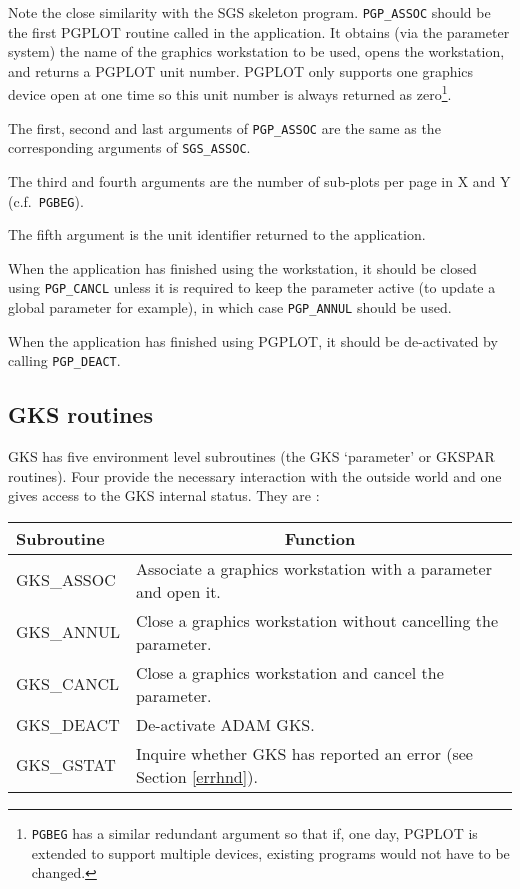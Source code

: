 Note the close similarity with the SGS skeleton program. {\tt PGP\_ASSOC} 
should be
the first PGPLOT routine called in the application. It obtains (via the
parameter system) the name of the graphics workstation  to be used, opens the
workstation, and returns a PGPLOT unit number. PGPLOT only supports one
graphics device open at one time so this unit number is always returned as
zero\footnote{{\tt PGBEG} has a similar redundant argument so that if, one day,
PGPLOT is extended to support multiple devices, existing programs would not
have to be changed.}.

The first, second and last arguments of {\tt PGP\_ASSOC} are the same as the
corresponding arguments of {\tt SGS\_ASSOC}.

The third and fourth arguments are the number of sub-plots per page in X and Y
(c.f.\ {\tt PGBEG}).

The fifth argument is the unit identifier returned to the application.

When the application has finished using the workstation, it should be closed
using {\tt PGP\_CANCL} unless it is required to keep the parameter active 
(to update a global parameter for example), in which case {\tt PGP\_ANNUL} 
should be used.

When the application has finished using PGPLOT, it should be de-activated by
calling {\tt PGP\_DEACT}.

\subsection{GKS routines}

GKS has five environment level subroutines (the GKS `parameter' or GKSPAR
routines). Four provide the necessary interaction with the outside world
and one gives access to the GKS internal status.
They are :

\begin{center}
\begin{tabular}{||l|l||} \hline
Subroutine & \multicolumn{1}{c||}{Function} \\ \hline
GKS\_ASSOC  & Associate a graphics workstation with a parameter and open it.\\
GKS\_ANNUL  & Close a graphics workstation without cancelling the parameter.\\
GKS\_CANCL  & Close a graphics workstation and cancel the parameter.\\
GKS\_DEACT  & De-activate ADAM GKS.\\ 
GKS\_GSTAT  & Inquire whether GKS has reported an error 
(see Section \ref{errhnd}). \\ \hline
\end{tabular}
\end{center}

